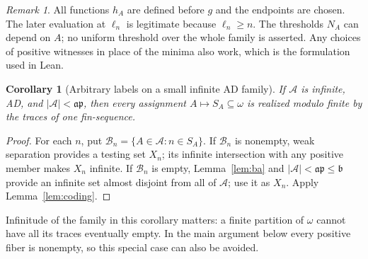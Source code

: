 \documentclass[11pt,letterpaper]{article}
\newtheorem{corollary}[theorem]{Corollary}
\theoremstyle{definition}
\theoremstyle{remark}
\newtheorem{remark}[theorem]{Remark}
\newcommand{\bnum}{\mathfrak{b}}
\newcommand{\ap}{\mathfrak{ap}}
\newcommand{\A}{\mathcal{A}}
\begin{document}
\begin{remark}
All functions $h_A$ are defined before $g$ and the endpoints are chosen.
The later evaluation at $\ell_n$ is legitimate because $\ell_n\geq n$.
The thresholds $N_A$ can depend on $A$; no uniform threshold over the whole
family is asserted. Any choices of positive witnesses in place of the
minima also work, which is the formulation used in Lean.
\end{remark}

\begin{corollary}[Arbitrary labels on a small infinite AD family]\label{cor:labels}
If $\A$ is infinite, AD, and $|\A|<\ap$, then every assignment
$A\mapsto S_A\subseteq\omega$ is realized modulo finite by the traces of
one fin-sequence.
\end{corollary}
\begin{proof}
For each $n$, put $\mathcal B_n=\{A\in\A:n\in S_A\}$.
If $\mathcal B_n$ is nonempty, weak separation provides a testing set $X_n$;
its infinite intersection with any positive member makes $X_n$ infinite.
If $\mathcal B_n$ is empty, Lemma~\ref{lem:ba} and $|\A|<\ap\leq\bnum$
provide an infinite set almost disjoint from all of $\A$; use it as $X_n$.
Apply Lemma~\ref{lem:coding}.
\end{proof}

Infinitude of the family in this corollary matters: a finite partition of
$\omega$ cannot have all its traces eventually empty. In the main argument
below every positive fiber is nonempty, so this special case can also be avoided.
\end{document}
